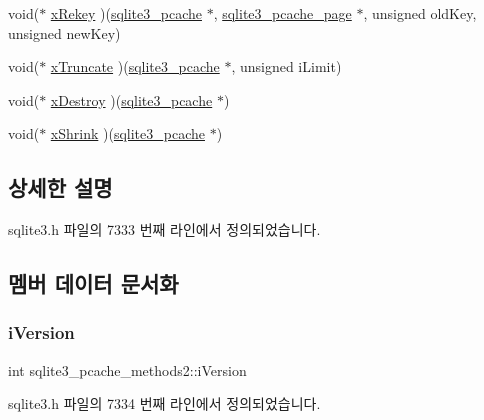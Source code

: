 \begin{DoxyCompactItemize}
\item 
void($\ast$ \hyperlink{structsqlite3__pcache__methods2_ad5b7609bdc0d2ae80325f7925b76c0af}{x\+Rekey} )(\hyperlink{sqlite3_8h_a096c453d937d51f7926d7d31c8e0bd2f}{sqlite3\+\_\+pcache} $\ast$, \hyperlink{structsqlite3__pcache__page}{sqlite3\+\_\+pcache\+\_\+page} $\ast$, unsigned old\+Key, unsigned new\+Key)
\item 
void($\ast$ \hyperlink{structsqlite3__pcache__methods2_a711d60b1895622a10186a2894cef1383}{x\+Truncate} )(\hyperlink{sqlite3_8h_a096c453d937d51f7926d7d31c8e0bd2f}{sqlite3\+\_\+pcache} $\ast$, unsigned i\+Limit)
\item 
void($\ast$ \hyperlink{structsqlite3__pcache__methods2_a17a43db31d015c29e44d68c752682365}{x\+Destroy} )(\hyperlink{sqlite3_8h_a096c453d937d51f7926d7d31c8e0bd2f}{sqlite3\+\_\+pcache} $\ast$)
\item 
void($\ast$ \hyperlink{structsqlite3__pcache__methods2_a225971a193ff429d9f1339aca39c7755}{x\+Shrink} )(\hyperlink{sqlite3_8h_a096c453d937d51f7926d7d31c8e0bd2f}{sqlite3\+\_\+pcache} $\ast$)
\end{DoxyCompactItemize}


\subsection{상세한 설명}


sqlite3.\+h 파일의 7333 번째 라인에서 정의되었습니다.



\subsection{멤버 데이터 문서화}
\mbox{\label{structsqlite3__pcache__methods2_a03b27be6c7cb8f1d2662c454cbe58483}} 
\subsubsection{\texorpdfstring{i\+Version}{iVersion}}
{\footnotesize\ttfamily int sqlite3\+\_\+pcache\+\_\+methods2\+::i\+Version}



sqlite3.\+h 파일의 7334 번째 라인에서 정의되었습니다.

\mbox{\label{structsqlite3__pcache__methods2_aee83131f16bb88218d7b0339854719d6}} 
